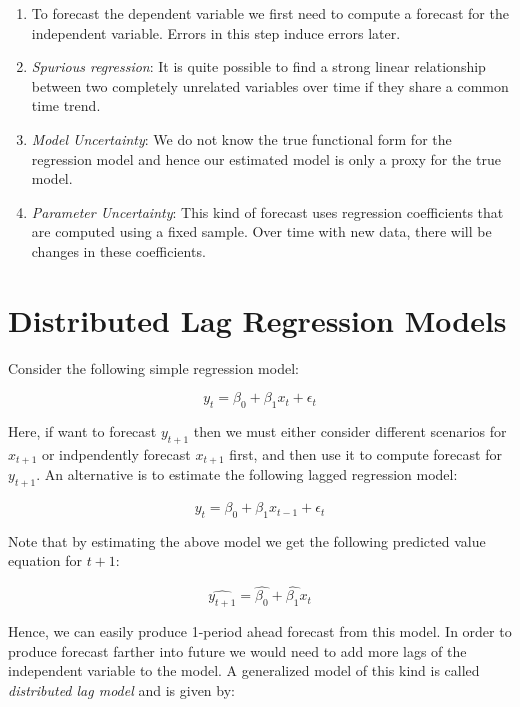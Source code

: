 \documentclass[]{book}
\theoremstyle{definition}
\theoremstyle{definition}
\theoremstyle{definition}
\theoremstyle{remark}
\begin{document}
\begin{enumerate}
\def\labelenumi{\arabic{enumi}.}
\item
  To forecast the dependent variable we first need to compute a forecast
  for the independent variable. Errors in this step induce errors later.
\item
  \emph{Spurious regression}: It is quite possible to find a strong
  linear relationship between two completely unrelated variables over
  time if they share a common time trend.
\item
  \emph{Model Uncertainty}: We do not know the true functional form for
  the regression model and hence our estimated model is only a proxy for
  the true model.
\item
  \emph{Parameter Uncertainty}: This kind of forecast uses regression
  coefficients that are computed using a fixed sample. Over time with
  new data, there will be changes in these coefficients.
\end{enumerate}

\section{Distributed Lag Regression
Models}\label{distributed-lag-regression-models}

Consider the following simple regression model:

\begin{equation}
y_t= \beta_0 +\beta_1 x_t + \epsilon_t
\end{equation}

Here, if want to forecast \(y_{t+1}\) then we must either consider
different scenarios for \(x_{t+1}\) or indpendently forecast \(x_{t+1}\)
first, and then use it to compute forecast for \(y_{t+1}\). An
alternative is to estimate the following lagged regression model:

\begin{equation}
y_t= \beta_0 +\beta_1 x_{t-1} + \epsilon_t
\end{equation}

Note that by estimating the above model we get the following predicted
value equation for \(t+1\):

\begin{equation}
\widehat{y_{t+1}}=\widehat{\beta_0}+\widehat{\beta_1}x_{t}
\end{equation}

Hence, we can easily produce 1-period ahead forecast from this model. In
order to produce forecast farther into future we would need to add more
lags of the independent variable to the model. A generalized model of
this kind is called \emph{distributed lag model} and is given by:
\end{document}
